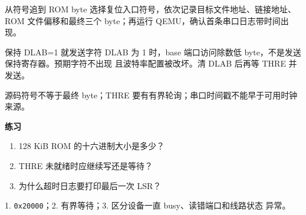 
\begin{experimentbox}{从符号追到 ROM byte}
选择复位入口符号，依次记录目标文件地址、链接地址、ROM 文件偏移和最终三个
byte；再运行 QEMU，确认首条串口日志带时间出现。
\end{experimentbox}

\begin{faultinjectionbox}{保持 DLAB=1 就发送字符}
DLAB 为 1 时，base 端口访问除数低 byte，不是发送保持寄存器。预期字符不出现
且波特率配置被改坏。清 DLAB 后再等 THRE 并发送。
\end{faultinjectionbox}

\begin{pitfallbox}
源码符号不等于最终 byte；THRE 要有有界轮询；串口时间戳不能早于可用时钟来源。
\end{pitfallbox}

\textbf{练习}
\begin{enumerate}[leftmargin=2.2em]
  \item 128 KiB ROM 的十六进制大小是多少？
  \item THRE 未就绪时应继续写还是等待？
  \item 为什么超时日志要打印最后一次 LSR？
\end{enumerate}
\begin{answerbox}
1. \texttt{0x20000}；2. 有界等待；3. 区分设备一直 busy、读错端口和线路状态
异常。
\end{answerbox}
